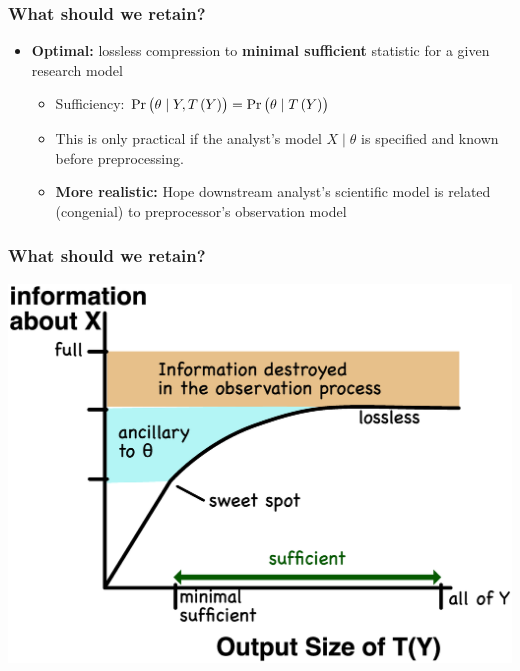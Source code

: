 \documentclass[10pt, compress]{beamer}
\begin{document}
\begin{frame}[fragile]
    \frametitle{What should we retain?}
    \begin{itemize}
        \item \textbf{Optimal:} lossless compression to \textbf{minimal sufficient} statistic for a given research model
            \begin{itemize}
                \item Sufficiency: $\Pr\del{\theta \mid Y,T\del{Y}}=\Pr\del{\theta \mid T\del{Y}}$
                \item This is only practical if the analyst's model $X \mid \theta$ is specified and known before preprocessing.
                \item \textbf{More realistic:} Hope downstream analyst's scientific model is related (congenial) to preprocessor's observation model
            \end{itemize}
    \end{itemize}
\end{frame}

\begin{frame}[fragile]
    \frametitle{What should we retain?}
    \includegraphics[width=\textwidth]{assets/information.eps}
\end{frame}
\end{document}
